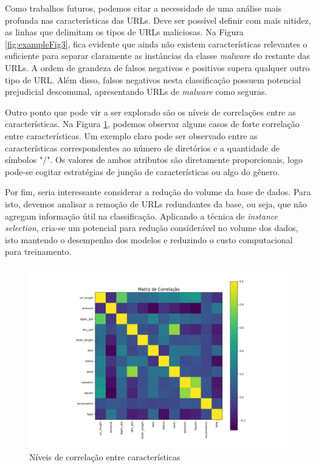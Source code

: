 \documentclass[manuscript,screen,review]{acmart}
\begin{document}
Como trabalhos futuros, podemos citar a necessidade de uma análise mais profunda nas características das URLs. Deve ser possível definir com mais nitidez, as linhas que delimitam os tipos de URLs maliciosas. Na Figura \ref{fig:exampleFig3}, fica evidente que ainda não existem características relevantes o suficiente para separar claramente as instâncias da classe \emph{malware} do restante das URLs. A ordem de grandeza de falsos negativos e positivos supera qualquer outro tipo de URL. Além disso, falsos negativos nesta classificação possuem potencial prejudicial descomunal, apresentando URLs de \emph{malware} como seguras.

Outro ponto que pode vir a ser explorado são os níveis de correlações entre as características. Na Figura \ref{fig:exampleFig4}, podemos observar alguns casos de forte correlação entre características. Um exemplo claro pode ser observado entre as características correspondentes ao número de diretórios e a quantidade de símbolos "/". Os valores de ambos atributos são diretamente proporcionais, logo pode-se cogitar estratégias de junção de características ou algo do gênero.

Por fim, seria interessante considerar a redução do volume da base de dados. Para isto, devemos analisar a remoção de URLs redundantes da base, ou seja, que não agregam informação útil na classificação. Aplicando a técnica de \emph{instance selection}, cria-se um potencial para redução considerável no volume dos dados, isto mantendo o desempenho dos modelos e reduzindo o custo computacional para treinamento.

\begin{figure}[H]
    \centering
    \vspace*{-1.15cm}
    \includegraphics[width=1.1\textwidth]{pic/corr.pdf}
    \caption{Níveis de correlação entre características}
    \label{fig:exampleFig4}
\end{figure}
\vspace*{-0.5cm}



\end{document}
